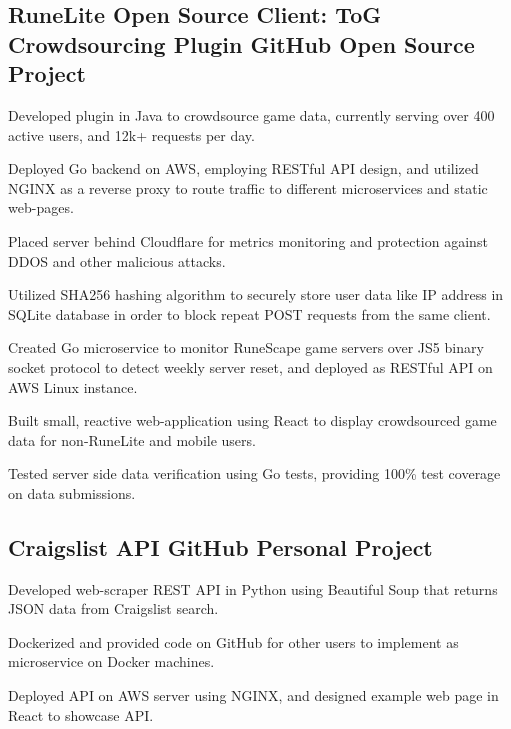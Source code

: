 \documentclass[letter,10pt]{article}
\begin{document}
\subsection{{RuneLite Open Source Client: ToG Crowdsourcing Plugin \hfill GitHub Open Source Project}}
\subtext{Full Stack Software Engineer 
\hfill \underline{\href{https://github.com/jcarbelbide/togcrowdsourcing.com}{github.com/jcarbelbide/togcrowdsourcing.com}}}
\begin{zitemize}
\item Developed plugin in Java to crowdsource game data, currently serving over 400 active users, and 12k+ requests per day. 
\item Deployed Go backend on AWS, employing RESTful API design, and utilized NGINX as a reverse proxy to route traffic to different microservices and static web-pages.
\item Placed server behind Cloudflare for metrics monitoring and protection against DDOS and other malicious attacks.
\item Utilized SHA256 hashing algorithm to securely store user data like IP address in SQLite database in order to block repeat POST requests from the same client. 
\item Created Go microservice to monitor RuneScape game servers over JS5 binary socket protocol to detect weekly server reset, and deployed as RESTful API on AWS Linux instance. 
\item Built small, reactive web-application using React to display crowdsourced game data for non-RuneLite and mobile users.
\item Tested server side data verification using Go tests, providing 100\% test coverage on data submissions. 
\end{zitemize}

\subsection{{Craigslist API \hfill GitHub Personal Project}}
\subtext{Back End Software Engineer 
\hfill \underline{\href{https://github.com/jcarbelbide/craigslist-api}{github.com/jcarbelbide/craigslist-api}}}
\begin{zitemize}
\item Developed web-scraper REST API in Python using Beautiful Soup that returns JSON data from Craigslist search. 
\item Dockerized and provided code on GitHub for other users to implement as microservice on Docker machines. 
\item Deployed API on AWS server using NGINX, and designed example web page in React to showcase API.
\end{zitemize}
\end{document}
